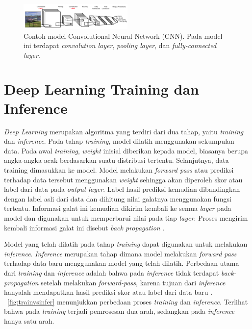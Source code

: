 \begin{figure}
	\centering
	\includegraphics[width=0.50\textwidth]
	{pics/cnn.png}
	\caption{Contoh model Convolutional Neural Network (CNN). Pada model ini terdapat \textit{convolution layer}, \textit{pooling layer}, dan \textit{fully-connected layer}.}
	\label{fig:cnn}
\end{figure}

\section{Deep Learning Training dan Inference}
\textit{Deep Learning} merupakan algoritma yang terdiri dari dua tahap, yaitu \textit{training} dan \textit{inference}. Pada tahap \textit{training}, model dilatih menggunakan sekumpulan data. Pada awal \textit{training}, \textit{weight} inisial diberikan kepada model, biasanya berupa angka-angka acak berdasarkan suatu distribusi tertentu. Selanjutnya, data training dimasukkan ke model. Model melakukan \textit{forward pass} atau prediksi terhadap data tersebut menggunakan \textit{weight} sehingga akan diperoleh skor atau label dari data pada \textit{output layer}. Label hasil prediksi kemudian dibandingkan dengan label asli dari data dan dihitung nilai galatnya menggunakan fungsi tertentu. Informasi galat ini kemudian dikirim kembali ke semua \textit{layer} pada model dan digunakan untuk memperbarui nilai \weight pada tiap \textit{layer}. Proses mengirim kembali informasi galat ini disebut \textit{back propagation} \cite{trainvsinfer}. 

Model yang telah dilatih pada tahap \textit{training} dapat digunakan untuk melakukan \textit{inference}. \textit{Inference} merupakan tahap dimana model melakukan \textit{forward pass} terhadap data baru menggunakan model yang telah dilatih. Perbedaan utama dari \textit{training} dan \textit{inference} adalah bahwa pada \textit{inference} tidak terdapat \textit{back-propagation} setelah melakukan \textit{forward-pass}, karena tujuan dari \textit{inference} hanyalah mendapatkan hasil prediksi skor atau label dari data baru \cite{trainvsinfer}. \pic~\ref{fig:trainvsinfer} menunjukkan perbedaan proses \textit{training} dan \textit{inference}. Terlihat bahwa pada \textit{training} terjadi pemrosesan dua arah, sedangkan pada \textit{inference} hanya satu arah.

